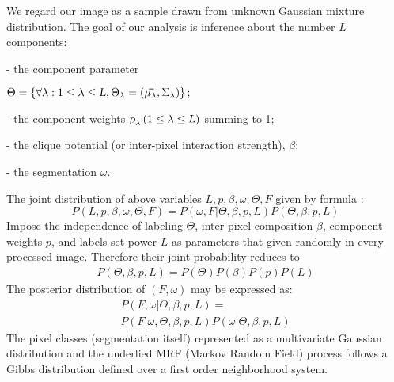 \documentclass[journal]{IEEEtran}
\begin{document}
We regard our image as a sample drawn from unknown Gaussian mixture distribution. The goal of our analysis is inference about the number 
$L$ components:

- the component parameter 

\begin{flushright}
$\Theta = \left\{\forall\lambda : 1\leq \lambda \leq \textsl{L}, \Theta_{\lambda}=\left(\vec{\mu_{\lambda}},\Sigma_{\lambda} \right) \right\};$
\end{flushright}

- the component weights $\textsl p_{\lambda}\left(1\leq\lambda\leq \textsl L \right)$ summing to 1;

- the clique potential (or inter-pixel interaction strength), $\beta$;
 
- the segmentation $\omega$.

The joint distribution of above variables $L,p,\beta,\omega,\Theta,F$ given by formula :
\begin{equation}
P\left(L,p,\beta,\omega,\Theta,F\right) = P\left(\omega,F\left|\Theta,\beta,p,L\right.\right)P\left(\Theta,\beta,p,L\right)
\end{equation}
Impose the independence of labeling $\Theta$, inter-pixel composition $\beta$, component weights $p$, and labels set power $L$ as parameters that given randomly in every processed image. Therefore their joint probability reduces to 
\begin{eqnarray}
P\left(\Theta,\beta,p,L\right) = P\left(\Theta\right)P\left(\beta\right)P\left(p\right)P\left(L\right)
\end{eqnarray}
The posterior distribution of $\left(F, \omega \right)$ may be expressed as:
\begin{eqnarray}
P\left(F,\omega\left|\right.\Theta,\beta,p,L\right)=\nonumber\\
P\left(F\left|\right.\omega,\Theta,\beta,p,L\right)P\left(\omega\left|\right.\Theta,\beta,p,L\right)
\end{eqnarray}
The pixel classes (segmentation itself) represented as a multivariate Gaussian distribution and the underlied MRF (Markov Random Field) process follows a Gibbs distribution defined over a first order neighborhood system. 
\end{document}
